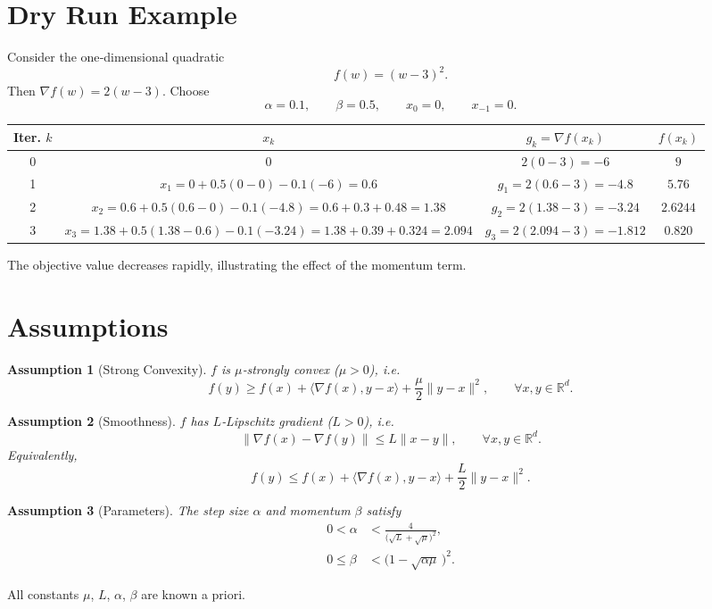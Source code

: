\documentclass[12pt]{article}
\newtheorem{assumption}{Assumption}
\newcommand{\R}{\mathbb{R}}
\begin{document}
\section*{Dry Run Example}
Consider the one‑dimensional quadratic
\[
f(w)=(w-3)^2 .
\]
Then $\nabla f(w)=2(w-3)$.  Choose
\[
\alpha=0.1,\qquad \beta=0.5,\qquad x_0=0,\qquad x_{-1}=0 .
\]

\begin{center}
\begin{tabular}{c|c|c|c}
\textbf{Iter. $k$} & $x_k$ & $g_k=\nabla f(x_k)$ & $f(x_k)$ \\ \hline
0 & $0$ & $2(0-3)=-6$ & $9$ \\[2mm]
1 & $x_1 = 0 +0.5(0-0)-0.1(-6)=0.6$ & $g_1=2(0.6-3)=-4.8$ & $5.76$ \\[2mm]
2 & $x_2 = 0.6+0.5(0.6-0)-0.1(-4.8)=0.6+0.3+0.48=1.38$ & $g_2=2(1.38-3)=-3.24$ & $2.6244$ \\[2mm]
3 & $x_3 = 1.38+0.5(1.38-0.6)-0.1(-3.24)=1.38+0.39+0.324=2.094$ & $g_3=2(2.094-3)=-1.812$ & $0.820$ 
\end{tabular}
\end{center}
The objective value decreases rapidly, illustrating the effect of the momentum term.

\section*{Assumptions}
\begin{assumption}[Strong Convexity]\label{as:strong}
$f$ is $\mu$‑strongly convex ($\mu>0$), i.e.
\[
f(y)\ge f(x)+\langle\nabla f(x),y-x\rangle+\frac{\mu}{2}\|y-x\|^{2},
\qquad\forall x,y\in\R^{d}.
\]
\end{assumption}
\begin{assumption}[Smoothness]\label{as:smooth}
$f$ has $L$‑Lipschitz gradient ($L>0$), i.e.
\[
\|\nabla f(x)-\nabla f(y)\|\le L\|x-y\|,\qquad\forall x,y\in\R^{d}.
\]
Equivalently,
\[
f(y)\le f(x)+\langle\nabla f(x),y-x\rangle+\frac{L}{2}\|y-x\|^{2}.
\]
\end{assumption}
\begin{assumption}[Parameters]\label{as:params}
The step size $\alpha$ and momentum $\beta$ satisfy
\begin{align}
0<\alpha &< \frac{4}{\bigl(\sqrt{L}+\sqrt{\mu}\bigr)^{2}}, \label{eq:alpha}\\[1mm]
0\le \beta &<\bigl(1-\sqrt{\alpha\mu}\,\bigr)^{2}. \label{eq:beta}
\end{align}
\end{assumption}
All constants $\mu$, $L$, $\alpha$, $\beta$ are known a priori.
\end{document}
